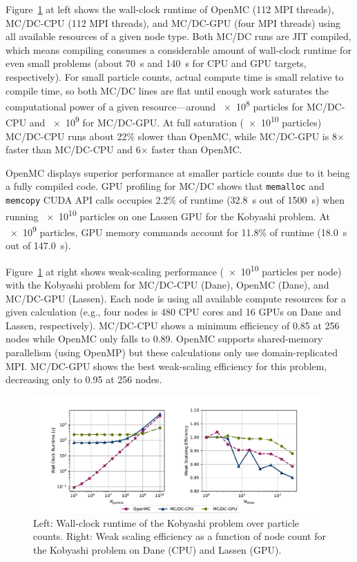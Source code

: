 Figure~\ref{performance_results} at left shows the wall-clock runtime of OpenMC (112 MPI threads), MC/DC-CPU (112 MPI threads), and MC/DC-GPU (four MPI threads) using all available resources of a given node type.
Both MC/DC runs are JIT compiled, which means compiling consumes a considerable amount of wall-clock runtime for even small problems (about \SI{70}{\s} and \SI{140}{\s} for CPU and GPU targets, respectively).
For small particle counts, actual compute time is small relative to compile time, so both MC/DC lines are flat until enough work saturates the computational power of a given resource---around \num{e8} particles for MC/DC-CPU and \num{e9} for MC/DC-GPU.
At full saturation (\num{e10} particles) MC/DC-CPU runs about 22\% slower than OpenMC, while MC/DC-GPU is 8$\times$ faster than MC/DC-CPU and 6$\times$ faster than OpenMC.

OpenMC displays superior performance at smaller particle counts due to it being a fully compiled code.
GPU profiling for MC/DC shows that
\texttt{memalloc} and \texttt{memcopy} CUDA API calls 
occupies 2.2\% of runtime (\SI{32.8}{\s} out of \SI{1500}{\s})
when running \num{e10} particles on one Lassen GPU for the Kobyashi problem.
At \num{e9} particles, GPU memory commands account for 11.8\% of runtime (\SI{18.0}{\s} out of \SI{147.0}{\s}).


Figure~\ref{performance_results} at right shows weak-scaling performance (\num{e10} particles per node) with the Kobyashi problem for MC/DC-CPU (Dane), OpenMC (Dane), and MC/DC-GPU (Lassen).
Each node is using all available compute resources for a given calculation (e.g., four nodes is 480 CPU cores and 16 GPUs on Dane and Lassen, respectively).
MC/DC-CPU shows a minimum efficiency of \num{0.85} at 256 nodes while OpenMC only falls to \num{0.89}.
OpenMC supports shared-memory parallelism (using OpenMP) but these calculations only use domain-replicated MPI.
MC/DC-GPU shows the best weak-scaling efficiency for this problem, decreasing only to \num{0.95} at 256 nodes.

\begin{figure}[h]
    \centerline{
    \includegraphics[width=1.1\textwidth]{figures/cise_figs/comps.pdf}
    }
    \caption{Left: Wall-clock runtime of the Kobyashi problem over particle counts. 
    Right: Weak scaling efficiency as a function of node count for the Kobyashi problem on Dane (CPU) and Lassen (GPU).}
    \label{performance_results}
\end{figure}

